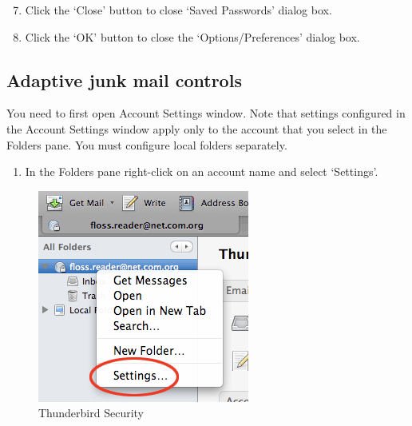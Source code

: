 \begin{enumerate}[1.]
\setcounter{enumi}{6}
\item
  Click the `Close' button to close `Saved Passwords' dialog box.
\item
  Click the `OK' button to close the `Options/Preferences' dialog box.
\end{enumerate}
\subsection{Adaptive junk mail controls}

You need to first open Account Settings window. Note that settings
configured in the Account Settings window apply only to the account that
you select in the Folders pane. You must configure local folders
separately.

\begin{enumerate}[1.]
\item
  In the Folders pane right-click on an account name and select
  `Settings'.
\end{enumerate}
\begin{figure}[htbp]
\centering
\includegraphics{thunderbird_sec_8.jpg}
\caption{Thunderbird Security}
\end{figure}

